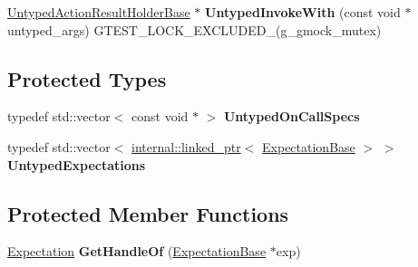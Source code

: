\begin{DoxyCompactItemize}
\item 
\hyperlink{classtesting_1_1internal_1_1UntypedActionResultHolderBase}{Untyped\+Action\+Result\+Holder\+Base} $\ast$ {\bfseries Untyped\+Invoke\+With} (const void $\ast$untyped\+\_\+args) G\+T\+E\+S\+T\+\_\+\+L\+O\+C\+K\+\_\+\+E\+X\+C\+L\+U\+D\+E\+D\+\_\+(g\+\_\+gmock\+\_\+mutex)\hypertarget{classtesting_1_1internal_1_1UntypedFunctionMockerBase_a442b83b807e0518d1dbca382abbbc8c8}{}\label{classtesting_1_1internal_1_1UntypedFunctionMockerBase_a442b83b807e0518d1dbca382abbbc8c8}

\end{DoxyCompactItemize}
\subsection*{Protected Types}
\begin{DoxyCompactItemize}
\item 
typedef std\+::vector$<$ const void $\ast$ $>$ {\bfseries Untyped\+On\+Call\+Specs}\hypertarget{classtesting_1_1internal_1_1UntypedFunctionMockerBase_a29cc87ed60ad0218432aa777abba7dbb}{}\label{classtesting_1_1internal_1_1UntypedFunctionMockerBase_a29cc87ed60ad0218432aa777abba7dbb}

\item 
typedef std\+::vector$<$ \hyperlink{classtesting_1_1internal_1_1linked__ptr}{internal\+::linked\+\_\+ptr}$<$ \hyperlink{classtesting_1_1internal_1_1ExpectationBase}{Expectation\+Base} $>$ $>$ {\bfseries Untyped\+Expectations}\hypertarget{classtesting_1_1internal_1_1UntypedFunctionMockerBase_a36480bd395e110b4eae5b0d0402de966}{}\label{classtesting_1_1internal_1_1UntypedFunctionMockerBase_a36480bd395e110b4eae5b0d0402de966}

\end{DoxyCompactItemize}
\subsection*{Protected Member Functions}
\begin{DoxyCompactItemize}
\item 
\hyperlink{classtesting_1_1Expectation}{Expectation} {\bfseries Get\+Handle\+Of} (\hyperlink{classtesting_1_1internal_1_1ExpectationBase}{Expectation\+Base} $\ast$exp)\hypertarget{classtesting_1_1internal_1_1UntypedFunctionMockerBase_a7705611c4a63df16cddb0674878c403a}{}\label{classtesting_1_1internal_1_1UntypedFunctionMockerBase_a7705611c4a63df16cddb0674878c403a}

\end{DoxyCompactItemize}
